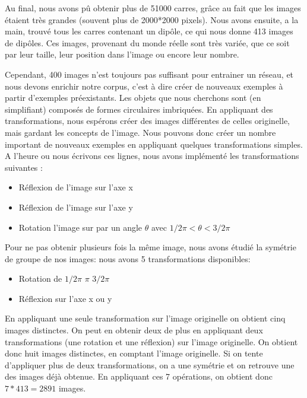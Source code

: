 \documentclass[a4paper, 12pt, titlepage, oneside, french]{article}
\begin{document}
Au final, nous avons pû obtenir plus de 51000 carres, grâce au fait que les images étaient très grandes (souvent plus de 2000*2000 pixels). Nous avons ensuite, a la main, trouvé tous les carres contenant un dipôle, ce qui nous donne 413 images de dipôles. Ces images, provenant du monde réelle sont très variée, que ce soit par leur taille, leur position dans l'image ou encore leur nombre.

	Cependant, 400 images n'est toujours pas suffisant pour entrainer un réseau, et nous devons enrichir notre corpus, c'est à dire créer de nouveaux exemples à partir d'exemples préexistants. Les objets que nous cherchons sont (en simplifiant) composés de formes circulaires imbriquées. En appliquant des transformations, nous espérons créer des images différentes de celles originelle, mais gardant les concepts de l'image. Nous pouvons donc créer un nombre important de nouveaux exemples en appliquant quelques transformations simples. A l'heure ou nous écrivons ces lignes, nous avons implémenté les transformations suivantes :
	\begin{itemize}
		\item Réflexion de l'image sur l'axe x %
		\item Réflexion de l'image sur l'axe y 
		\item Rotation l'image sur par un angle $\theta$ avec $1/2\pi < \theta < 3/2\pi$  
	\end{itemize}
Pour ne pas obtenir plusieurs fois la même image, nous avons étudié la symétrie de groupe de nos images: nous avons 5 transformations disponibles: 
	\begin{itemize}
		\item Rotation de $1/2\pi$ $\pi$ $3/2\pi$
		\item Réflexion sur l'axe x ou y
	\end{itemize}
	En appliquant une seule transformation sur l'image originelle on obtient cinq images distinctes. On peut en obtenir deux de plus en appliquant deux transformations (une rotation et une réflexion) sur l'image originelle. On obtient donc huit images distinctes, en comptant l'image originelle. Si on tente d'appliquer plus de deux transformations, on a une symétrie et on retrouve une des images déjà obtenue.
	En appliquant ces 7 opérations, on obtient donc $7*413 = 2891$ images.  
\end{document}
